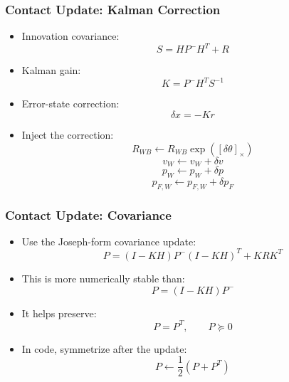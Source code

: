 \documentclass[aspectratio=169]{beamer}
\begin{document}
\begin{frame}
	\frametitle{Contact Update: Kalman Correction}
	
	\begin{itemize}
		\item Innovation covariance:
		\[
		S = HP^-H^T + R
		\]
		
		\item Kalman gain:
		\[
		K = P^-H^TS^{-1}
		\]
		
		\item Error-state correction:
		\[
		\delta x = -Kr
		\]
		
		\item Inject the correction:
		\[
		R_{WB} \leftarrow R_{WB}\exp([\delta\theta]_\times)
		\]
		\[
		v_W \leftarrow v_W + \delta v
		\]
		\[
		p_W \leftarrow p_W + \delta p
		\]
		\[
		p_{F,W} \leftarrow p_{F,W} + \delta p_F
		\]
	\end{itemize}
	
\end{frame}


\begin{frame}
	\frametitle{Contact Update: Covariance}
	
	\begin{itemize}
		\item Use the Joseph-form covariance update:
		\[
		P =
		(I-KH)P^-(I-KH)^T
		+
		KRK^T
		\]
		
		\item This is more numerically stable than:
		\[
		P = (I-KH)P^-
		\]
		
		\item It helps preserve:
		\[
		P = P^T,
		\qquad
		P \succeq 0
		\]
		
		\item In code, symmetrize after the update:
		\[
		P \leftarrow \frac{1}{2}(P + P^T)
		\]
	\end{itemize}
	
\end{frame}
\end{document}
